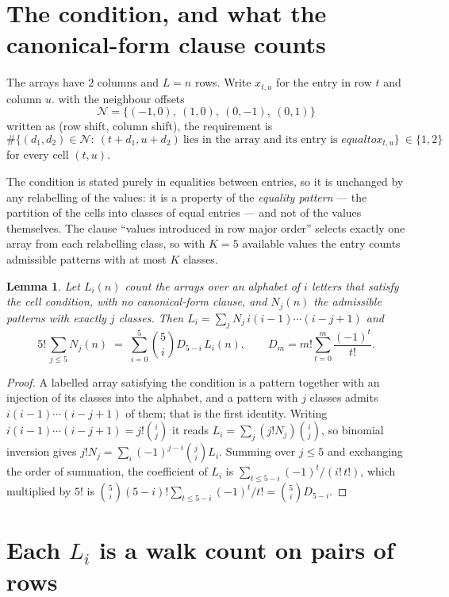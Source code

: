 \documentclass[11pt,a4paper]{article}
\theoremstyle{plain}
\newtheorem{lemma}[theorem]{Lemma}
\theoremstyle{definition}
\begin{document}
\section{The condition, and what the canonical-form clause counts}

The arrays have $2$ columns and $L=n$ rows. Write $x_{t,u}$ for the entry in
row $t$ and column $u$. with the neighbour offsets
\[
\mathcal N=\{(-1,0),\ (1,0),\ (0,-1),\ (0,1)\}
\]
written as (row shift, column shift), the requirement is
\begin{equation}\label{eq:loc}
\#\bigl\{(d_1,d_2)\in\mathcal N:\ (t+d_1,u+d_2)\ \text{lies in the array and its entry is }
equal to x_{t,u}\bigr\}\ \in\{1,2\}
\end{equation}
for every cell $(t,u)$.

The condition is stated purely in equalities between entries, so it is unchanged by any
relabelling of the values: it is a property of the \emph{equality pattern} --- the partition
of the cells into classes of equal entries --- and not of the values themselves. The clause
``values introduced in row major order'' selects exactly one array from each relabelling
class, so with $K=5$ available values the entry counts admissible patterns with at most $K$
classes.

\begin{lemma}\label{lem:inv}
Let $L_i(n)$ count the arrays over an alphabet of $i$ letters that satisfy the cell
condition, with no canonical-form clause, and $N_j(n)$ the admissible patterns with exactly
$j$ classes. Then $L_i=\sum_j N_j\,i(i-1)\cdots(i-j+1)$ and
\[
5!\,\sum_{j\le 5}N_j(n)\;=\;\sum_{i=0}^{5}\binom{5}{i}D_{5-i}\,L_i(n),
\qquad D_m=m!\sum_{t=0}^{m}\frac{(-1)^t}{t!} .
\]
\end{lemma}

\begin{proof}
A labelled array satisfying the condition is a pattern together with an injection of its
classes into the alphabet, and a pattern with $j$ classes admits $i(i-1)\cdots(i-j+1)$ of
them; that is the first identity. Writing $i(i-1)\cdots(i-j+1)=j!\binom{i}{j}$ it reads
$L_i=\sum_j(j!N_j)\binom{i}{j}$, so binomial inversion gives
$j!N_j=\sum_i(-1)^{j-i}\binom{j}{i}L_i$. Summing over $j\le5$ and exchanging the
order of summation, the coefficient of $L_i$ is
$\sum_{t\le5-i}(-1)^t/(i!\,t!)$, which multiplied by $5!$ is
$\binom{5}{i}(5-i)!\sum_{t\le5-i}(-1)^t/t!=\binom{5}{i}D_{5-i}$.
\end{proof}

\section{Each $L_i$ is a walk count on pairs of rows}
\end{document}
